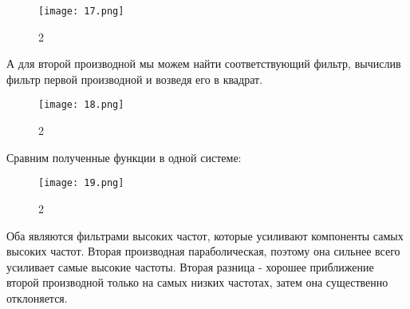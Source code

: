 \documentclass[10pt,a4paper,oneside]{article}
\begin{document}
\begin{figure}[H]
        \centering
        \texttt{[image: 17.png]}
        \caption{2}
        \label{fig:first}
\end{figure}

А для второй производной мы можем найти соответствующий фильтр, вычислив фильтр первой производной и возведя его в квадрат.

\begin{figure}[H]
        \centering
        \texttt{[image: 18.png]}
        \caption{2}
        \label{fig:first}
\end{figure}

Сравним полученные функции в одной системе:

\begin{figure}[H]
        \centering
        \texttt{[image: 19.png]}
        \caption{2}
        \label{fig:first}
\end{figure}

Оба являются фильтрами высоких частот, которые усиливают компоненты самых высоких частот. Вторая производная параболическая, поэтому она сильнее всего усиливает самые высокие частоты. Вторая разница - хорошее приближение второй производной только на самых низких частотах, затем она существенно отклоняется.
\end{document}
